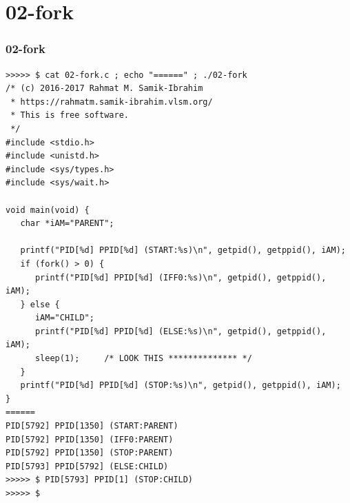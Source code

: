 \documentclass[aspectratio=169, xcolor=table, notheorems, hyperref={pdfpagelabels=false}]{beamer}
\begin{document}
\section{02-fork}
\begin{frame}[fragile]
\frametitle{02-fork}
\begin{lstlisting}[basicstyle=\ttfamily\tiny]
>>>>> $ cat 02-fork.c ; echo "======" ; ./02-fork 
/* (c) 2016-2017 Rahmat M. Samik-Ibrahim
 * https://rahmatm.samik-ibrahim.vlsm.org/
 * This is free software.
 */
#include <stdio.h>
#include <unistd.h>
#include <sys/types.h>
#include <sys/wait.h>

void main(void) {
   char *iAM="PARENT";
  
   printf("PID[%d] PPID[%d] (START:%s)\n", getpid(), getppid(), iAM);
   if (fork() > 0) {
      printf("PID[%d] PPID[%d] (IFF0:%s)\n", getpid(), getppid(), iAM);
   } else {
      iAM="CHILD";
      printf("PID[%d] PPID[%d] (ELSE:%s)\n", getpid(), getppid(), iAM);
      sleep(1);     /* LOOK THIS ************** */
   }
   printf("PID[%d] PPID[%d] (STOP:%s)\n", getpid(), getppid(), iAM);
}
======
PID[5792] PPID[1350] (START:PARENT)
PID[5792] PPID[1350] (IFF0:PARENT)
PID[5792] PPID[1350] (STOP:PARENT)
PID[5793] PPID[5792] (ELSE:CHILD)
>>>>> $ PID[5793] PPID[1] (STOP:CHILD)
>>>>> $
\end{lstlisting}
\end{frame}

\end{document}
